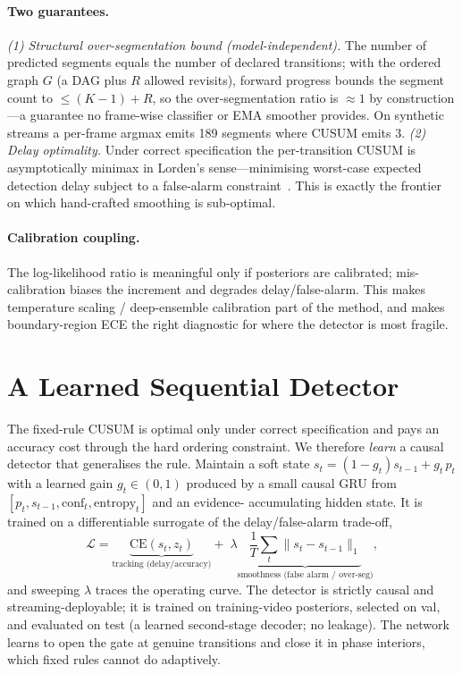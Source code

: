 \documentclass[11pt]{article}
\begin{document}
\paragraph{Two guarantees.}
\emph{(1) Structural over-segmentation bound (model-independent).} The number of
predicted segments equals the number of declared transitions; with the ordered
graph $G$ (a DAG plus $R$ allowed revisits), forward progress bounds the segment
count to $\le (K{-}1)+R$, so the over-segmentation ratio is $\approx 1$ by
construction---a guarantee no frame-wise classifier or EMA smoother provides. On
synthetic streams a per-frame argmax emits 189 segments where CUSUM emits 3.
\emph{(2) Delay optimality.} Under correct specification the per-transition CUSUM is
asymptotically minimax in Lorden's sense---minimising worst-case expected detection
delay subject to a false-alarm constraint~\cite{lorden1971,moustakides1986}. This is
exactly the frontier on which hand-crafted smoothing is sub-optimal.

\paragraph{Calibration coupling.} The log-likelihood ratio is meaningful only if
posteriors are calibrated; mis-calibration biases the increment and degrades
delay/false-alarm. This makes temperature scaling / deep-ensemble calibration part
of the method, and makes boundary-region ECE the right diagnostic for where the
detector is most fragile.

\section{A Learned Sequential Detector}
\label{sec:learned}
The fixed-rule CUSUM is optimal only under correct specification and pays an
accuracy cost through the hard ordering constraint. We therefore \emph{learn} a
causal detector that generalises the rule. Maintain a soft state
$s_t=(1-g_t)s_{t-1}+g_t\,p_t$ with a learned gain $g_t\in(0,1)$ produced by a small
causal GRU from $[p_t,s_{t-1},\mathrm{conf}_t,\mathrm{entropy}_t]$ and an evidence-
accumulating hidden state. It is trained on a differentiable surrogate of the
delay/false-alarm trade-off,
\begin{equation}
\mathcal{L}=\underbrace{\mathrm{CE}(s_t,z_t)}_{\text{tracking (delay/accuracy)}}
+\;\lambda\underbrace{\textstyle\frac1T\sum_t\lVert s_t-s_{t-1}\rVert_1}_{\text{smoothness (false alarm / over-seg)}},
\end{equation}
and sweeping $\lambda$ traces the operating curve. The detector is strictly causal
and streaming-deployable; it is trained on training-video posteriors, selected on
val, and evaluated on test (a learned second-stage decoder; no leakage). The network
learns to open the gate at genuine transitions and close it in phase interiors,
which fixed rules cannot do adaptively.
\end{document}
